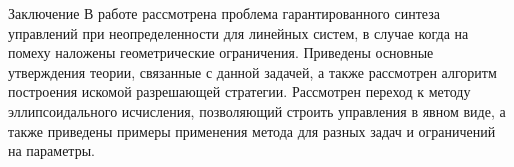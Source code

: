 \newpage

\begin{section}{Заключение}
    В работе рассмотрена проблема гарантированного синтеза управлений при неопределенности для линейных
     систем, в случае когда на помеху наложены геометрические ограничения. Приведены основные утверждения теории,
     связанные с данной задачей, а также рассмотрен алгоритм построения искомой
     разрешающей стратегии. Рассмотрен переход к методу эллипсоидального исчисления, позволяющий строить управления
     в явном виде, а также приведены примеры применения метода для разных
     задач и ограничений на параметры. 
\end{section}